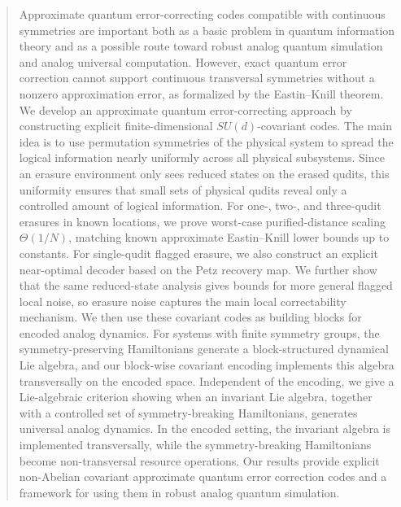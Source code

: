 \documentclass[10pt,twocolumn,superscriptaddress,aps,amsmath,amssymb,citeautoscript,floatfix,prx,longbibliography]{revtex4-2}
\newcounter{alg}
\theoremstyle{plain}
\theoremstyle{plain}
\theoremstyle{plain}
\theoremstyle{plain}
\theoremstyle{plain}
\theoremstyle{plain}
\begin{document}
\begin{abstract}
Approximate quantum error-correcting codes compatible with continuous symmetries are important both as a basic problem in quantum information theory and as a possible route toward robust analog quantum simulation and analog universal computation. However, exact quantum error correction cannot support continuous transversal symmetries without a nonzero approximation error, as formalized by the Eastin--Knill theorem. We develop an approximate quantum error-correcting approach by constructing explicit finite-dimensional \(SU(d)\)-covariant codes. The main idea is to use permutation symmetries of the physical system to spread the logical information nearly uniformly across all physical subsystems. Since an erasure environment only sees reduced states on the erased qudits, this uniformity ensures that small sets of physical qudits reveal only a controlled amount of logical information. For one-, two-, and three-qudit erasures in known locations, we prove worst-case purified-distance scaling \(\Theta(1/N)\), matching known approximate Eastin--Knill lower bounds up to constants. For single-qudit flagged
erasure, we also construct an explicit near-optimal decoder based on the Petz recovery map. We further show that the same reduced-state analysis gives bounds for more general flagged local noise, so erasure noise captures the main local correctability mechanism. We then use these covariant codes as building blocks for encoded analog dynamics. For systems with finite symmetry groups, the symmetry-preserving Hamiltonians generate a block-structured dynamical Lie algebra, and our block-wise covariant encoding implements this algebra transversally on the encoded space. Independent of the encoding, we give a Lie-algebraic criterion showing when an invariant Lie algebra, together with a controlled set of symmetry-breaking Hamiltonians, generates universal analog dynamics. In the encoded setting, the invariant algebra is implemented transversally, while the symmetry-breaking Hamiltonians become non-transversal resource operations. Our results provide explicit non-Abelian covariant approximate quantum error correction codes and a framework for using them in robust analog quantum simulation.


\end{abstract}
\end{document}

